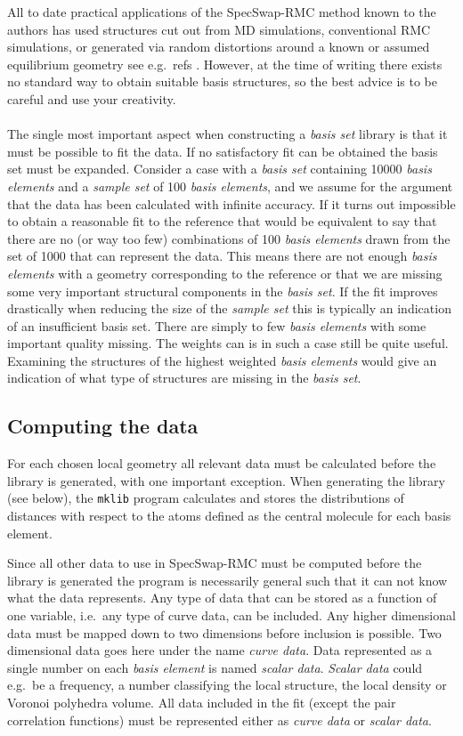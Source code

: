 \documentclass[a4paper, 10pt]{article}
\begin{document}
All to date practical applications of the SpecSwap-RMC method known to
the authors has used structures cut out from MD simulations, conventional RMC
simulations, or generated via random distortions around a known or
assumed equilibrium geometry see e.g.\ refs \cite{SS-RMC, SS-RMC-EXAFS}.
However, at the time of
writing there exists no standard way to obtain
suitable basis structures, so the best advice is to be careful and use your
creativity.
\\\\
The single most important aspect when constructing a {\it basis set} library
is that it must be possible to fit the data. If no satisfactory fit
can be obtained the basis set must be expanded. Consider a case with a {\it basis set} containing 10000 {\it basis elements}
and a {\it sample set} of 100 {\it basis elements}, and we assume for
the argument that the
data has been calculated with infinite accuracy. If it turns out
impossible to obtain a reasonable fit to the reference that would  be equivalent
to say that there are no (or way too few) combinations of 100 {\it
  basis elements} drawn from the set of 1000 that can represent the
data. This means there are not enough {\it basis elements} with a
geometry corresponding to the reference or that we are missing some
very important structural components in the {\it basis set}.
If the fit improves drastically when reducing the size of the {\it
  sample set} this is typically an indication of an insufficient
basis set. There are simply to few {\it basis elements} with some
important quality missing.
The weights can is in such a case still be quite useful.
Examining the structures of the highest weighted {\it basis elements}
would give an indication of what type of structures are missing in the
{\it basis set}.

\subsection{Computing the data}
For each chosen local geometry all relevant data must be calculated
before the library is generated,
with one important exception. When generating the library (see below),
the {\tt mklib} program calculates and stores the distributions of
distances with respect to the atoms defined as the central molecule
for each basis element.

Since all other data to use in SpecSwap-RMC must be computed before
the library is generated the
program is necessarily general such that it can not know what the
data represents. Any type of data that can be stored as a function of
one variable, i.e.\ any type of curve data, can be included. Any higher
dimensional data must be mapped down to two dimensions before
inclusion is possible. Two dimensional data goes here under the name
{\it curve data}.
Data represented as a single number on each {\it basis element} is
named {\it scalar data}. {\it Scalar data} could e.g.\ be a frequency, a number
classifying the local structure, the local density or Voronoi
polyhedra volume.
All data included in the fit (except the pair correlation
functions) must be represented either as {\it curve
  data } or {\it scalar data}.
\end{document}
